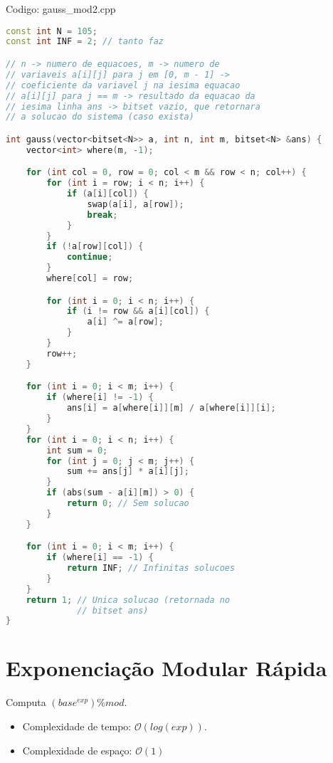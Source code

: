 \documentclass[10pt, a4paper, oneside]{book}
\begin{document}
\hfill

Codigo: gauss\_mod2.cpp

\begin{lstlisting}[language=C++]
const int N = 105;
const int INF = 2; // tanto faz

// n -> numero de equacoes, m -> numero de
// variaveis a[i][j] para j em [0, m - 1] ->
// coeficiente da variavel j na iesima equacao
// a[i][j] para j == m -> resultado da equacao da
// iesima linha ans -> bitset vazio, que retornara
// a solucao do sistema (caso exista)

int gauss(vector<bitset<N>> a, int n, int m, bitset<N> &ans) {
    vector<int> where(m, -1);

    for (int col = 0, row = 0; col < m && row < n; col++) {
        for (int i = row; i < n; i++) {
            if (a[i][col]) {
                swap(a[i], a[row]);
                break;
            }
        }
        if (!a[row][col]) {
            continue;
        }
        where[col] = row;

        for (int i = 0; i < n; i++) {
            if (i != row && a[i][col]) {
                a[i] ^= a[row];
            }
        }
        row++;
    }

    for (int i = 0; i < m; i++) {
        if (where[i] != -1) {
            ans[i] = a[where[i]][m] / a[where[i]][i];
        }
    }
    for (int i = 0; i < n; i++) {
        int sum = 0;
        for (int j = 0; j < m; j++) {
            sum += ans[j] * a[i][j];
        }
        if (abs(sum - a[i][m]) > 0) {
            return 0; // Sem solucao
        }
    }

    for (int i = 0; i < m; i++) {
        if (where[i] == -1) {
            return INF; // Infinitas solucoes
        }
    }
    return 1; // Unica solucao (retornada no
              // bitset ans)
}
\end{lstlisting}
\hfill

\section{Exponenciação Modular Rápida}


Computa $(base^{exp}) \% mod$.



\begin{itemize}
\item Complexidade de tempo: $\mathcal{O}(log(exp))$.
\item Complexidade de espaço: $\mathcal{O}(1)$
\end{itemize}
\end{document}

